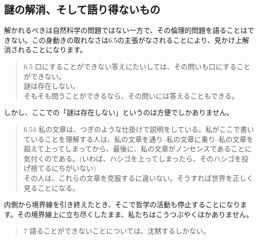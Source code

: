 \documentclass[12pt]{jsarticle}
\begin{document}
\subsection{謎の解消、そして語り得ないもの}
解かれるべきは自然科学の問題ではない一方で、その倫理的問題を語ることはできない。この身動きの取れなさは6.5の主張がなされることにより、見かけ上解消されることになります。
\begin{quote}
6.5 口にすることができない答えにたいしては、その問いも口にすることができない。\\
謎は存在しない。\\
そもそも問うことができるなら、その問いには答えることもできる。
\end{quote}
しかし、ここでの「謎は存在しない」というのは方便でしかありません。
\begin{quote}
6.54 私の文章は、つぎのような仕掛けで説明をしている。私がここで書いていることを理解する人は、私の文章を通り--私の文章に乗り--私の文章を超えて上ってしまってから、最後に、私の文章がノンセンスであることに気付くのである。(いわば、ハシゴを上ってしまったら、そのハシゴを投げ捨てるにちがいない)\\
その人は、これらの文章を克服するに違いない。そうすれば世界を正しく見ることになる。
\end{quote}
内側から境界線を引き終えたとき、そこで哲学の活動も停止することになります。その境界線上に立ち尽くしたまま、私たちはこうつぶやくほかありません。
\\
\begin{quote}
7 語ることができないことについては、沈黙するしかない。
\end{quote}
\newpage

\end{document}
